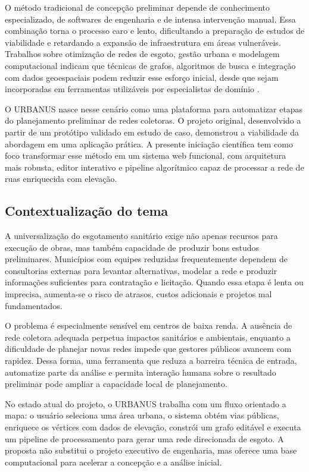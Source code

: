 \documentclass[12pt,a4paper]{article}
\begin{document}
O método tradicional de concepção preliminar depende de conhecimento especializado, de softwares de engenharia e de intensa intervenção manual. Essa combinação torna o processo caro e lento, dificultando a preparação de estudos de viabilidade e retardando a expansão de infraestrutura em áreas vulneráveis. Trabalhos sobre otimização de redes de esgoto, gestão urbana e modelagem computacional indicam que técnicas de grafos, algoritmos de busca e integração com dados geoespaciais podem reduzir esse esforço inicial, desde que sejam incorporadas em ferramentas utilizáveis por especialistas de domínio \cite{weng2014, haghighi2012, melo2019, rodrigues2020}.

O URBANUS nasce nesse cenário como uma plataforma para automatizar etapas do planejamento preliminar de redes coletoras. O projeto original, desenvolvido a partir de um protótipo validado em estudo de caso, demonstrou a viabilidade da abordagem em uma aplicação prática. A presente iniciação científica tem como foco transformar esse método em um sistema web funcional, com arquitetura mais robusta, editor interativo e pipeline algorítmico capaz de processar a rede de ruas enriquecida com elevação.


\subsection{Contextualização do tema}

A universalização do esgotamento sanitário exige não apenas recursos para execução de obras, mas também capacidade de produzir bons estudos preliminares. Municípios com equipes reduzidas frequentemente dependem de consultorias externas para levantar alternativas, modelar a rede e produzir informações suficientes para contratação e licitação. Quando essa etapa é lenta ou imprecisa, aumenta-se o risco de atrasos, custos adicionais e projetos mal fundamentados.

O problema é especialmente sensível em centros de baixa renda. A ausência de rede coletora adequada perpetua impactos sanitários e ambientais, enquanto a dificuldade de planejar novas redes impede que gestores públicos avancem com rapidez. Dessa forma, uma ferramenta que reduza a barreira técnica de entrada, automatize parte da análise e permita interação humana sobre o resultado preliminar pode ampliar a capacidade local de planejamento.

No estado atual do projeto, o URBANUS trabalha com um fluxo orientado a mapa: o usuário seleciona uma área urbana, o sistema obtém vias públicas, enriquece os vértices com dados de elevação, constrói um grafo editável e executa um pipeline de processamento para gerar uma rede direcionada de esgoto. A proposta não substitui o projeto executivo de engenharia, mas oferece uma base computacional para acelerar a concepção e a análise inicial.
\end{document}
